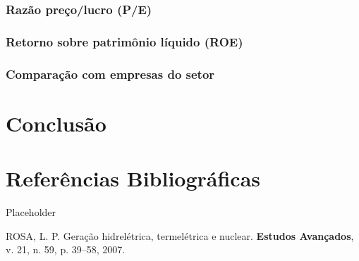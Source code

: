 \documentclass[grad,numbers]{coppe}
\newenvironment{cslreferences}%
  {}%
  {\par}
\begin{document}
  \hypertarget{razuxe3o-preuxe7olucro-pe}{%
  \subsection{Razão preço/lucro (P/E)}\label{razuxe3o-preuxe7olucro-pe}}

  \hypertarget{retorno-sobre-patrimuxf4nio-luxedquido-roe}{%
  \subsection{Retorno sobre patrimônio líquido (ROE)}\label{retorno-sobre-patrimuxf4nio-luxedquido-roe}}

  \hypertarget{comparauxe7uxe3o-com-empresas-do-setor}{%
  \subsection{Comparação com empresas do setor}\label{comparauxe7uxe3o-com-empresas-do-setor}}

  \hypertarget{conclusuxe3o}{%
  \chapter{Conclusão}\label{conclusuxe3o}}

  \hypertarget{referuxeancias-bibliogruxe1ficas}{%
  \chapter*{Referências Bibliográficas}\label{referuxeancias-bibliogruxe1ficas}}

  Placeholder

  \hypertarget{refs}{}
  \begin{cslreferences}
  \leavevmode\hypertarget{ref-rosa2007}{}%
  ROSA, L. P. Geração hidrelétrica, termelétrica e nuclear. \textbf{Estudos Avançados}, v. 21, n. 59, p. 39--58, 2007.
  \end{cslreferences}
  \backmatter
  
  

\end{document}
